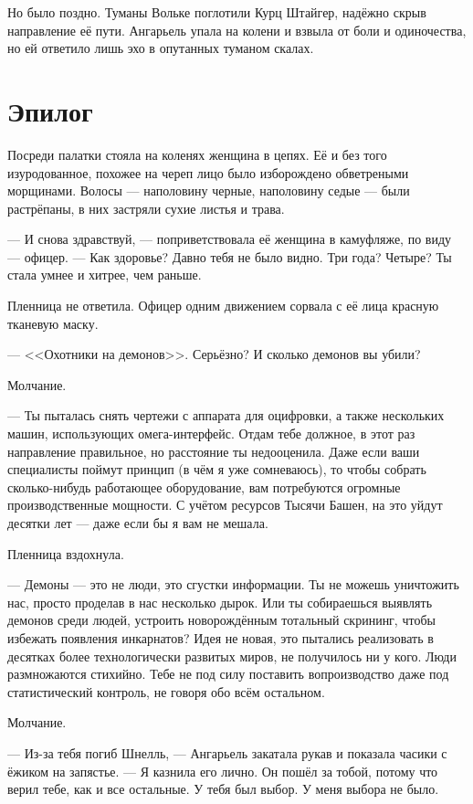Но было поздно.
Туманы Вольке поглотили Курц Штайгер, надёжно скрыв направление её пути.
Ангарьель упала на колени и взвыла от боли и одиночества, но ей ответило лишь эхо в опутанных туманом скалах.

\section{Эпилог}

Посреди палатки стояла на коленях женщина в цепях.
Её и без того изуродованное, похожее на череп лицо было изборождено обветреными морщинами.
Волосы --- наполовину черные, наполовину седые --- были растрёпаны, в них застряли сухие листья и трава.

--- И снова здравствуй, --- поприветствовала её женщина в камуфляже, по виду --- офицер.
--- Как здоровье?
Давно тебя не было видно.
Три года?
Четыре?
Ты стала умнее и хитрее, чем раньше.

Пленница не ответила.
Офицер одним движением сорвала с её лица красную тканевую маску.

--- <<Охотники на демонов>>.
Серьёзно?
И сколько демонов вы убили?

Молчание.

--- Ты пыталась снять чертежи с аппарата для оцифровки, а также нескольких машин, использующих омега-интерфейс.
Отдам тебе должное, в этот раз направление правильное, но расстояние ты недооценила.
Даже если ваши специалисты поймут принцип (в чём я уже сомневаюсь), то чтобы собрать сколько-нибудь работающее оборудование, вам потребуются огромные производственные мощности.
С учётом ресурсов Тысячи Башен, на это уйдут десятки лет --- даже если бы я вам не мешала.

Пленница вздохнула.

--- Демоны --- это не люди, это сгустки информации.
Ты не можешь уничтожить нас, просто проделав в нас несколько дырок.
Или ты собираешься выявлять демонов среди людей, устроить новорождённым тотальный скрининг, чтобы избежать появления инкарнатов?
Идея не новая, это пытались реализовать в десятках более технологически развитых миров, не получилось ни у кого.
Люди размножаются стихийно.
Тебе не под силу поставить вопроизводство даже под статистический контроль, не говоря обо всём остальном.

Молчание.

--- Из-за тебя погиб Шнелль, --- Ангарьель закатала рукав и показала часики с ёжиком на запястье.
--- Я казнила его лично.
Он пошёл за тобой, потому что верил тебе, как и все остальные.
У тебя был выбор.
У меня выбора не было.

